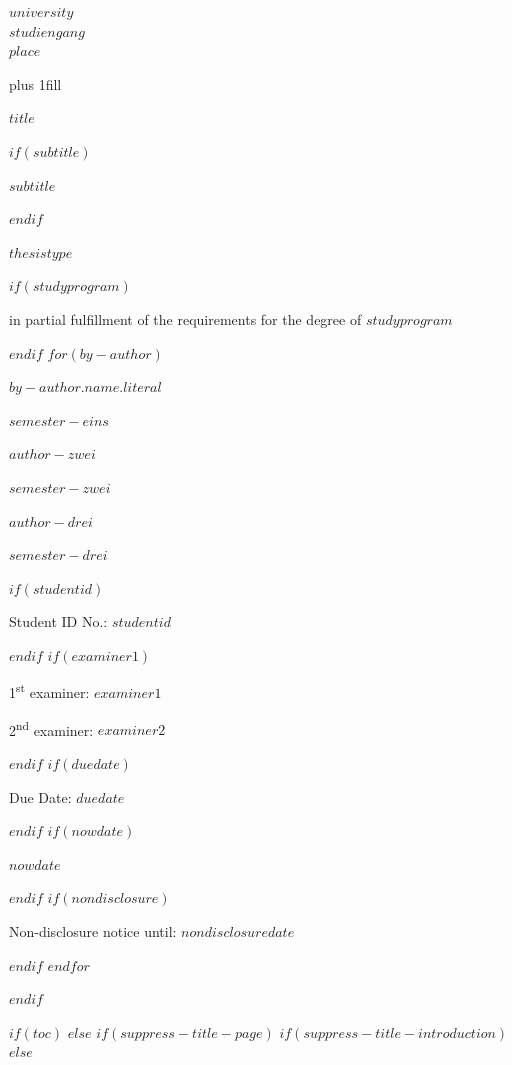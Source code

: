 {\centering
  {$university$\\
$studiengang$\\
 $place$  \par
}
  \hbox{}\vskip 0cm plus 1fill
  {\Large \bfseries $title$ \par}
  $if(subtitle)$
  {\large \bfseries $subtitle$ \par}
  $endif$
  \vspace{8ex}
  {$thesistype$ \par}
  $if(studyprogram)$
  {in partial fulfillment of the requirements for the degree of $studyprogram$ \par}
  $endif$
    \vfill
  $for(by-author)$
    {$by-author.name.literal$ \par}
      \vspace{0ex}
  {$semester-eins$ \par}
  \vspace{0ex}
    {\large $author-zwei$ \par}
  \vspace{0ex}
  {$semester-zwei$ \par}
    \vspace{0ex}
    {\large $author-drei$ \par}
  \vspace{0ex}
  {$semester-drei$ \par}
  $if(studentid)$
  {Student ID No.: $studentid$ \par}
  $endif$
  $if(examiner1)$
  \vspace{8ex}
  {1\textsuperscript{st} examiner: $examiner1$ \par}
  {2\textsuperscript{nd} examiner: $examiner2$ \par}
  $endif$
  \vfill
  $if(duedate)$
  {Due Date: $duedate$ \par}
  $endif$
  $if(nowdate)$
  {$nowdate$ \par}
  $endif$
    $if(nondisclosure)$
  {Non-disclosure notice until: $nondisclosuredate$ \par}
  $endif$
  $endfor$%
  \clearpage
}

$endif$


\renewcommand{\contentsname}{Table of Contents}

$if(toc)$
$else$
$if(suppress-title-page)$
$if(suppress-title-introduction)$
$else$
